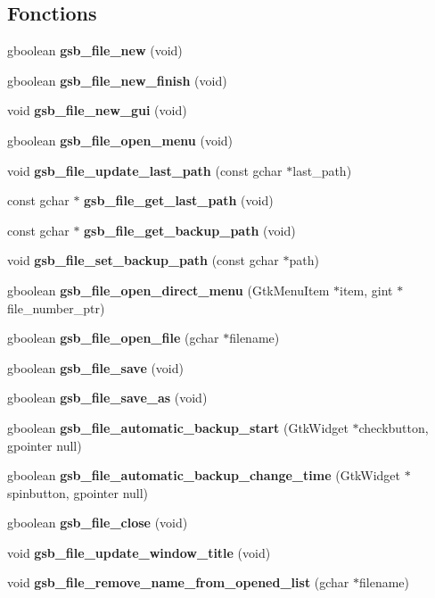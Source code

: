 \subsection*{Fonctions}
\begin{DoxyCompactItemize}
\item 
gboolean {\bf gsb\_\-file\_\-new} (void)
\item 
gboolean {\bf gsb\_\-file\_\-new\_\-finish} (void)
\item 
void {\bf gsb\_\-file\_\-new\_\-gui} (void)
\item 
gboolean {\bf gsb\_\-file\_\-open\_\-menu} (void)
\item 
void {\bf gsb\_\-file\_\-update\_\-last\_\-path} (const gchar $\ast$last\_\-path)
\item 
const gchar $\ast$ {\bf gsb\_\-file\_\-get\_\-last\_\-path} (void)
\item 
const gchar $\ast$ {\bf gsb\_\-file\_\-get\_\-backup\_\-path} (void)
\item 
void {\bf gsb\_\-file\_\-set\_\-backup\_\-path} (const gchar $\ast$path)
\item 
gboolean {\bf gsb\_\-file\_\-open\_\-direct\_\-menu} (GtkMenuItem $\ast$item, gint $\ast$file\_\-number\_\-ptr)
\item 
gboolean {\bf gsb\_\-file\_\-open\_\-file} (gchar $\ast$filename)
\item 
gboolean {\bf gsb\_\-file\_\-save} (void)
\item 
gboolean {\bf gsb\_\-file\_\-save\_\-as} (void)
\item 
gboolean {\bf gsb\_\-file\_\-automatic\_\-backup\_\-start} (GtkWidget $\ast$checkbutton, gpointer null)
\item 
gboolean {\bf gsb\_\-file\_\-automatic\_\-backup\_\-change\_\-time} (GtkWidget $\ast$spinbutton, gpointer null)
\item 
gboolean {\bf gsb\_\-file\_\-close} (void)
\item 
void {\bf gsb\_\-file\_\-update\_\-window\_\-title} (void)
\item 
void {\bf gsb\_\-file\_\-remove\_\-name\_\-from\_\-opened\_\-list} (gchar $\ast$filename)
\end{DoxyCompactItemize}
